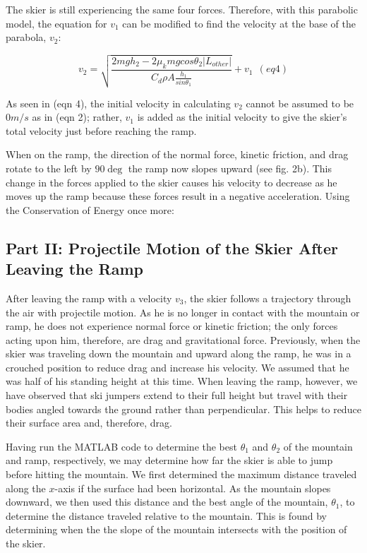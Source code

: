 \documentclass[]{IEEEphot}
\begin{document}
The skier is still experiencing the same four forces. Therefore, with this parabolic model, the equation for $v_1$ can be modified to find the velocity at the base of the parabola, $v_2$:

\[
	v_2 = \sqrt{\frac{2mgh_2 - 2\mu_k mgcos\theta_2 \left|L_{other}\right| }{C_d\rho A\frac{h_1}{sin\theta_1}}} + v_1\ \ (eq 4)
\]

As seen in (eqn 4), the initial velocity in calculating $v_2$ cannot be assumed to be $0 m/s$ as in (eqn 2); rather, $v_1$ is added as the initial velocity to give the skier’s total velocity just before reaching the ramp.

When on the ramp, the direction of the normal force, kinetic friction, and drag rotate to the left by $90\deg$ the ramp now slopes upward (see fig. 2b). This change in the forces applied to the skier causes his velocity to decrease as he moves up the ramp because these forces result in a negative acceleration. Using the Conservation of Energy once more:



\subsection{Part II: Projectile Motion of the Skier After Leaving the Ramp}

After leaving the ramp with a velocity $v_3$, the skier follows a trajectory through the air with projectile motion. As he is no longer in contact with the mountain or ramp, he does not experience normal force or kinetic friction; the only forces acting upon him, therefore, are drag and gravitational force. Previously, when the skier was traveling down the mountain and upward along the ramp, he was in a crouched position to reduce drag and increase his velocity. We assumed that he was half of his standing height at this time. When leaving the ramp, however, we have observed that ski jumpers extend to their full height but travel with their bodies angled towards the ground rather than perpendicular. This helps to reduce their surface area and, therefore, drag.

Having run the MATLAB code to determine the best $\theta_1$ and $\theta_2$ of the mountain and ramp, respectively, we may determine how far the skier is able to jump before hitting the mountain. We first determined the maximum distance traveled along the $x$-axis if the surface had been horizontal. As the mountain slopes downward, we then used this distance and the best angle of the mountain, $\theta_1$, to determine the distance traveled relative to the mountain. This is found by determining when the the slope of the mountain intersects with the position of the skier.
\end{document}
